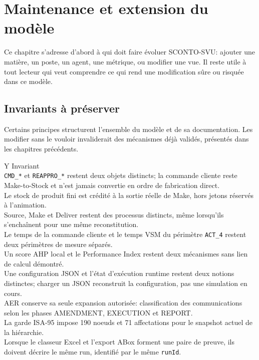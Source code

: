 \chapter{Maintenance et extension du modèle}
\label{chap:maintenance-extension}

Ce chapitre s'adresse d'abord à qui doit faire évoluer SCONTO-SVU: ajouter une matière, un poste, un agent, une métrique, ou modifier une vue. Il reste utile à tout lecteur qui veut comprendre ce qui rend une modification sûre ou risquée dans ce modèle.

\section{Invariants à préserver}

Certains principes structurent l'ensemble du modèle et de sa documentation. Les modifier sans le vouloir invaliderait des mécanismes déjà validés, présentés dans les chapitres précédents.

\begin{table}[H]
  \centering
  \begin{tabularx}{\textwidth}{Y}
    \toprule
    Invariant \\
    \midrule
    \texttt{CMD\_*} et \texttt{REAPPRO\_*} restent deux objets distincts; la commande cliente reste Make-to-Stock et n'est jamais convertie en ordre de fabrication direct. \\
    Le stock de produit fini est crédité à la sortie réelle de Make, hors jetons réservés à l'animation. \\
    Source, Make et Deliver restent des processus distincts, même lorsqu'ils s'enchaînent pour une même reconstitution. \\
    Le temps de la commande cliente et le temps VSM du périmètre \texttt{ACT\_4} restent deux périmètres de mesure séparés. \\
    Un score AHP local et le Performance Index restent deux mécanismes sans lien de calcul démontré. \\
    Une configuration JSON et l'état d'exécution runtime restent deux notions distinctes; charger un JSON reconstruit la configuration, pas une simulation en cours. \\
    AER conserve sa seule expansion autorisée: classification des communications selon les phases AMENDMENT, EXECUTION et REPORT. \\
    La garde ISA-95 impose 190 noeuds et 71 affectations pour le snapshot actuel de la hiérarchie. \\
    Lorsque le classeur Excel et l'export ABox forment une paire de preuve, ils doivent décrire le même run, identifié par le même \texttt{runId}. \\
    \bottomrule
  \end{tabularx}
  \caption{Invariants du modèle à préserver lors d'une évolution.}
  \label{tab:invariants-modele}
\end{table}

